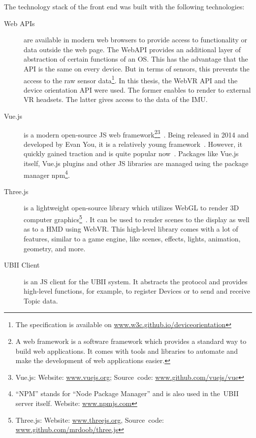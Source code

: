 The technology stack of the front end was built with the following technologies:
\begin{description}
	\item[Web APIs] are  available in modern web browsers to provide access to functionality or data outside the web page. The WebAPI provides an additional layer of abstraction of certain functions of an \gls{OS}. This has the advantage that the API is the same on every device. But in terms of sensors, this prevents the access to the raw sensor data\footnote{The specification is available on \href{https://w3c.github.io/deviceorientation/}{www.w3c.github.io/deviceorientation}}. In this thesis, the WebVR \gls{API} and the device orientation \gls{API} were used. The former enables to render to external \gls{VR} headsets. The latter gives access to the data of the \gls{IMU}.
	 
	\item[Vue.js] is a modern open-source \acrlong{JS} web framework\footnote{A web framework is a software framework which provides a standard way to build web applications. It comes with tools and libraries to automate and make the development of web applications easier.}\footnote{Vue.js: Website: \href{https://vuejs.org/}{www.vuejs.org}; Source~code: \href{https://github.com/vuejs/vue}{www.github.com/vuejs/vue}}~\cite{You.2019}. Being released in 2014 and developed by Evan You, it is a relatively young framework~\cite[17]{Koetsier.2016}. However, it quickly gained traction and is quite popular now~\cite[12\psq]{Koetsier.2016}.
  Packages like Vue.js itself, Vue.js plugins and other \acrlong{JS} libraries are managed using the package manager npm\footnote{\enquote{NPM} stands for \enquote{Node Package Manager} and is also used in the~\gls{UBII} server itself. Website: \href{https://www.npmjs.com/}{www.npmjs.com}}.
  
	\item[Three.js] is a lightweight open-source library which utilizes WebGL to render \gls{3D} computer graphics\footnote{Three.js: Website: \href{https://threejs.org/}{www.threejs.org}, Source~code: \href{https://github.com/mrdoob/three.js/}{www.github.com/mrdoob/three.js}}~\cite{Cabello.2019}. It can be used to render scenes to the display as well as to a \gls{HMD} using WebVR. This high-level library comes with a lot of features, similar to a game engine, like scenes, effects, lights, animation, geometry, and more.
	 
	\item[UBII Client] is an \acrlong{JS} client for the \gls{UBII} system. It abstracts the protocol and provides high-level functions, for example, to register Devices or to send and receive Topic data.
\end{description}

